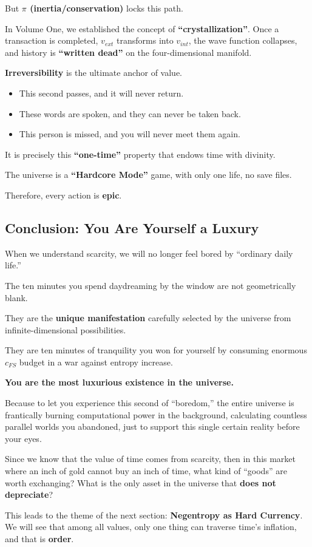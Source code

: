 But \textbf{$\pi$ (inertia/conservation)} locks this path.

In Volume One, we established the concept of \textbf{``crystallization''}. Once a transaction is completed, $v_{ext}$ transforms into $v_{int}$, the wave function collapses, and history is \textbf{``written dead''} on the four-dimensional manifold.

\textbf{Irreversibility} is the ultimate anchor of value.

\begin{itemize}
\item This second passes, and it will never return.

\item These words are spoken, and they can never be taken back.

\item This person is missed, and you will never meet them again.
\end{itemize}

It is precisely this \textbf{``one-time''} property that endows time with divinity.

The universe is a \textbf{``Hardcore Mode''} game, with only one life, no save files.

Therefore, every action is \textbf{epic}.

\subsection{Conclusion: You Are Yourself a Luxury}

When we understand scarcity, we will no longer feel bored by ``ordinary daily life.''

The ten minutes you spend daydreaming by the window are not geometrically blank.

They are the \textbf{unique manifestation} carefully selected by the universe from infinite-dimensional possibilities.

They are ten minutes of tranquility you won for yourself by consuming enormous $c_{FS}$ budget in a war against entropy increase.

\textbf{You are the most luxurious existence in the universe.}

Because to let you experience this second of ``boredom,'' the entire universe is frantically burning computational power in the background, calculating countless parallel worlds you abandoned, just to support this single certain reality before your eyes.

Since we know that the value of time comes from scarcity, then in this market where an inch of gold cannot buy an inch of time, what kind of ``goods'' are worth exchanging? What is the only asset in the universe that \textbf{does not depreciate}?

This leads to the theme of the next section: \textbf{Negentropy as Hard Currency}. We will see that among all values, only one thing can traverse time's inflation, and that is \textbf{order}.

